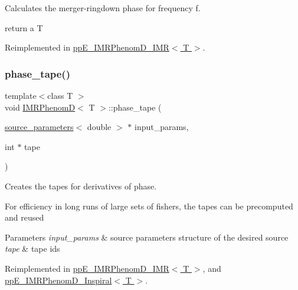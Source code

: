 Calculates the merger-\/ringdown phase for frequency f. 

return a T 

Reimplemented in \hyperlink{classppE__IMRPhenomD__IMR_a3b64e9bbf566450687bcfaa85c0e493f}{pp\+E\+\_\+\+I\+M\+R\+Phenom\+D\+\_\+\+I\+M\+R$<$ T $>$}.

\mbox{\label{classIMRPhenomD_ae456c25f87c34487e6e05f9cf5d2d08c}} 
\subsubsection{\texorpdfstring{phase\+\_\+tape()}{phase\_tape()}}
{\footnotesize\ttfamily template$<$class T $>$ \\
void \hyperlink{classIMRPhenomD}{I\+M\+R\+PhenomD}$<$ T $>$\+::phase\+\_\+tape (\begin{DoxyParamCaption}\item[{\hyperlink{structsource__parameters}{source\+\_\+parameters}$<$ double $>$ $\ast$}]{input\+\_\+params,  }\item[{int $\ast$}]{tape }\end{DoxyParamCaption})\hspace{0.3cm}{\ttfamily [virtual]}}



Creates the tapes for derivatives of phase. 

For efficiency in long runs of large sets of fishers, the tapes can be precomputed and reused 
\begin{DoxyParams}{Parameters}
{\em input\+\_\+params} & source parameters structure of the desired source \\
\hline
{\em tape} & tape ids \\
\hline
\end{DoxyParams}


Reimplemented in \hyperlink{classppE__IMRPhenomD__IMR_acf2ed8617b3e24ecc273a409ff579ce4}{pp\+E\+\_\+\+I\+M\+R\+Phenom\+D\+\_\+\+I\+M\+R$<$ T $>$}, and \hyperlink{classppE__IMRPhenomD__Inspiral_a2fb1a8fb66e4204dbe397b792933afbe}{pp\+E\+\_\+\+I\+M\+R\+Phenom\+D\+\_\+\+Inspiral$<$ T $>$}.

\mbox{\label{classIMRPhenomD_a0d33a9a937a36f395300bab4276102af}} 
